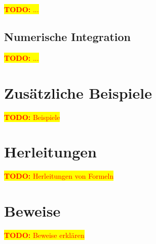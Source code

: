 \documentclass[10pt,a4paper]{article}
\newcommand{\todo}[1]{ \colorbox{yellow}{\textcolor{red}{\textbf{TODO:} {#1}}}\\ }
\begin{document}
\todo{...}

\subsection{Numerische Integration}
\todo{...}

\section{Zusätzliche Beispiele}
\todo{Beispiele}

\section{Herleitungen}
\todo{Herleitungen von Formeln}

\section{Beweise}
\todo{Beweise erklären}
\end{document}
